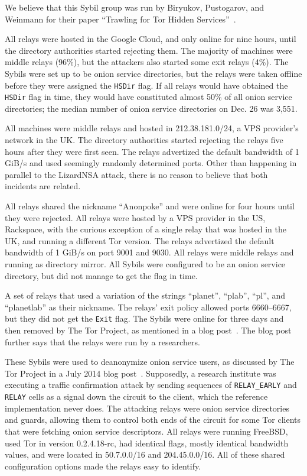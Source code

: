 We believe that this Sybil group was run by Biryukov, Pustogarov, and Weinmann
for their paper ``Trawling for Tor Hidden Services''~\cite{Biryukov2013a}.

All relays were hosted in the Google Cloud, and only online for nine hours,
until the directory authorities started rejecting them.  The majority of
machines were middle relays (96\%), but the attackers also started some exit
relays (4\%).  The Sybils were set up to be onion service directories, but the
relays were taken offline before they were assigned the \texttt{HSDir} flag.  If
all relays would have obtained the \texttt{HSDir} flag in time, they would have
constituted almost 50\% of all onion service directories; the median number of
onion service directories on Dec. 26 was 3,551.

All machines were middle relays and hosted in 212.38.181.0/24, a VPS provider's
network in the UK.  The directory authorities started rejecting the relays five
hours after they were first seen.  The relays advertized the default bandwidth
of 1 GiB/s and used seemingly randomly determined ports.  Other than happening
in parallel to the LizardNSA attack, there is no reason to believe that both
incidents are related.

All relays shared the nickname ``Anonpoke'' and were online for four hours until
they were rejected.  All relays were hosted by a VPS provider in the US,
Rackspace, with the curious exception of a single relay that was hosted in the
UK, and running a different Tor version.  The relays advertized the default
bandwidth of 1 GiB/s on port 9001 and 9030.  All relays were middle relays and
running as directory mirror.  All Sybils were configured to be an onion service
directory, but did not manage to get the flag in time.

A set of relays that used a variation of the strings ``planet'', ``plab'',
``pl'', and ``planetlab'' as their nickname.  The relays' exit policy allowed
ports 6660--6667, but they did not get the \texttt{Exit} flag.  The Sybils were
online for three days and then removed by The Tor Project, as mentioned in a
blog post~\cite{progressreport}.  The blog post further says that the relays
were run by a researchers.

These Sybils were used to deanonymize onion service users, as discussed by The
Tor Project in a July 2014 blog post~\cite{cmucert}.  Supposedly, a research
institute was executing a traffic confirmation attack by sending sequences of
\texttt{RELAY\_EARLY} and \texttt{RELAY} cells as a signal down the circuit to
the client, which the reference implementation never does.  The attacking relays
were onion service directories and guards, allowing them to control both ends of
the circuit for some Tor clients that were fetching onion service descriptors.
All relays were running FreeBSD, used Tor in version 0.2.4.18-rc, had identical
flags, mostly identical bandwidth values, and were located in 50.7.0.0/16 and
204.45.0.0/16.  All of these shared configuration options made the relays easy
to identify.

